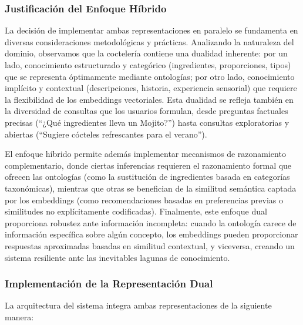\documentclass[runningheads]{llncs}
\begin{document}
\subsubsection{Justificación del Enfoque Híbrido}

La decisión de implementar ambas representaciones en paralelo se fundamenta en diversas consideraciones metodológicas y prácticas. Analizando la naturaleza del dominio, observamos que la coctelería contiene una dualidad inherente: por un lado, conocimiento estructurado y categórico (ingredientes, proporciones, tipos) que se representa óptimamente mediante ontologías; por otro lado, conocimiento implícito y contextual (descripciones, historia, experiencia sensorial) que requiere la flexibilidad de los embeddings vectoriales. Esta dualidad se refleja también en la diversidad de consultas que los usuarios formulan, desde preguntas factuales precisas (``¿Qué ingredientes lleva un Mojito?'') hasta consultas exploratorias y abiertas (``Sugiere cócteles refrescantes para el verano''). 

El enfoque híbrido permite además implementar mecanismos de razonamiento complementario, donde ciertas inferencias requieren el razonamiento formal que ofrecen las ontologías (como la sustitución de ingredientes basada en categorías taxonómicas), mientras que otras se benefician de la similitud semántica captada por los embeddings (como recomendaciones basadas en preferencias previas o similitudes no explícitamente codificadas). Finalmente, este enfoque dual proporciona robustez ante información incompleta: cuando la ontología carece de información específica sobre algún concepto, los embeddings pueden proporcionar respuestas aproximadas basadas en similitud contextual, y viceversa, creando un sistema resiliente ante las inevitables lagunas de conocimiento.

\subsubsection{Implementación de la Representación Dual}

La arquitectura del sistema integra ambas representaciones de la siguiente manera:
\end{document}
